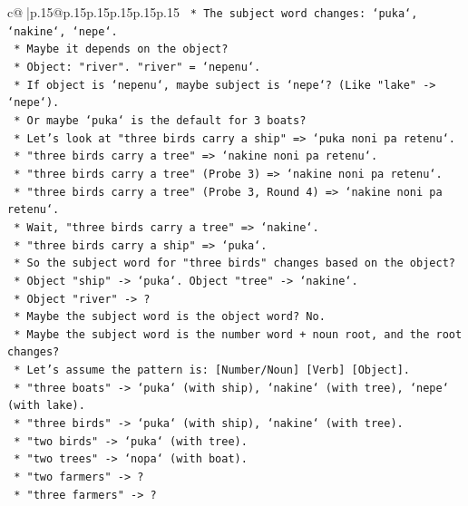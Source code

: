 \documentclass{article}
\begin{document}
{\begin{supertabular}{c@{$\;$}|p{.15\linewidth}@{}p{.15\linewidth}p{.15\linewidth}p{.15\linewidth}p{.15\linewidth}p{.15\linewidth}}
{{{\texttt{        *   The subject word changes: `puka`, `nakine`, `nepe`.} \\
\texttt{        *   Maybe it depends on the object?} \\
\texttt{        *   Object: "river". "river" = `nepenu`.} \\
\texttt{        *   If object is `nepenu`, maybe subject is `nepe`? (Like "lake" {-}> `nepe`).} \\
\texttt{        *   Or maybe `puka` is the default for 3 boats?} \\
\texttt{        *   Let's look at "three birds carry a ship" => `puka noni pa retenu`.} \\
\texttt{        *   "three birds carry a tree" => `nakine noni pa retenu`.} \\
\texttt{        *   "three birds carry a tree" (Probe 3) => `nakine noni pa retenu`.} \\
\texttt{        *   "three birds carry a tree" (Probe 3, Round 4) => `nakine noni pa retenu`.} \\
\texttt{        *   Wait, "three birds carry a tree" => `nakine`.} \\
\texttt{        *   "three birds carry a ship" => `puka`.} \\
\texttt{        *   So the subject word for "three birds" changes based on the object?} \\
\texttt{        *   Object "ship" {-}> `puka`. Object "tree" {-}> `nakine`.} \\
\texttt{        *   Object "river" {-}> ?} \\
\texttt{        *   Maybe the subject word is the object word? No.} \\
\texttt{        *   Maybe the subject word is the number word + noun root, and the root changes?} \\
\texttt{        *   Let's assume the pattern is: {[}Number/Noun{]} {[}Verb{]} {[}Object{]}.} \\
\texttt{        *   "three boats" {-}> `puka` (with ship), `nakine` (with tree), `nepe` (with lake).} \\
\texttt{        *   "three birds" {-}> `puka` (with ship), `nakine` (with tree).} \\
\texttt{        *   "two birds" {-}> `puka` (with tree).} \\
\texttt{        *   "two trees" {-}> `nopa` (with boat).} \\
\texttt{        *   "two farmers" {-}> ?} \\
\texttt{        *   "three farmers" {-}> ?} \\
}}}
\end{supertabular}}
\end{document}
